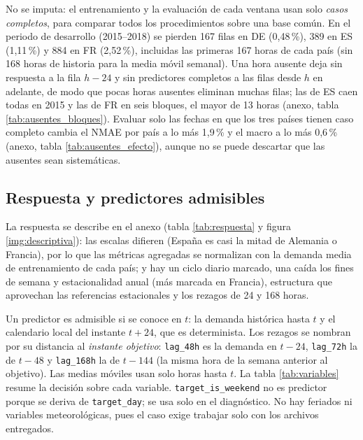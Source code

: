 No se imputa: el entrenamiento y la evaluación de cada ventana usan solo \textit{casos completos}, para comparar todos los procedimientos sobre una base común. En el periodo de desarrollo (2015--2018) se pierden 167 filas en DE (0,48\,\%), 389 en ES (1,11\,\%) y 884 en FR (2,52\,\%), incluidas las primeras 167 horas de cada país (sin 168 horas de historia para la media móvil semanal). Una hora ausente deja sin respuesta a la fila $h-24$ y sin predictores completos a las filas desde $h$ en adelante, de modo que pocas horas ausentes eliminan muchas filas; las de ES caen todas en 2015 y las de FR en seis bloques, el mayor de 13 horas (anexo, tabla \ref{tab:ausentes_bloques}). Evaluar solo las fechas en que los tres países tienen caso completo cambia el NMAE por país a lo más 1,9\,\% y el macro a lo más 0,6\,\% (anexo, tabla \ref{tab:ausentes_efecto}), aunque no se puede descartar que las ausentes sean sistemáticas.

\subsection{Respuesta y predictores admisibles}

La respuesta se describe en el anexo (tabla \ref{tab:respuesta} y figura \ref{img:descriptiva}): las escalas difieren (España es casi la mitad de Alemania o Francia), por lo que las métricas agregadas se normalizan con la demanda media de entrenamiento de cada país; y hay un ciclo diario marcado, una caída los fines de semana y estacionalidad anual (más marcada en Francia), estructura que aprovechan las referencias estacionales y los rezagos de 24 y 168 horas.

Un predictor es admisible si se conoce en $t$: la demanda histórica hasta $t$ y el calendario local del instante $t+24$, que es determinista. Los rezagos se nombran por su distancia al \textit{instante objetivo}: \texttt{lag\_48h} es la demanda en $t-24$, \texttt{lag\_72h} la de $t-48$ y \texttt{lag\_168h} la de $t-144$ (la misma hora de la semana anterior al objetivo). Las medias móviles usan solo horas hasta $t$. La tabla \ref{tab:variables} resume la decisión sobre cada variable. \texttt{target\_is\_weekend} no es predictor porque se deriva de \texttt{target\_day}; se usa solo en el diagnóstico. No hay feriados ni variables meteorológicas, pues el caso exige trabajar solo con los archivos entregados.

